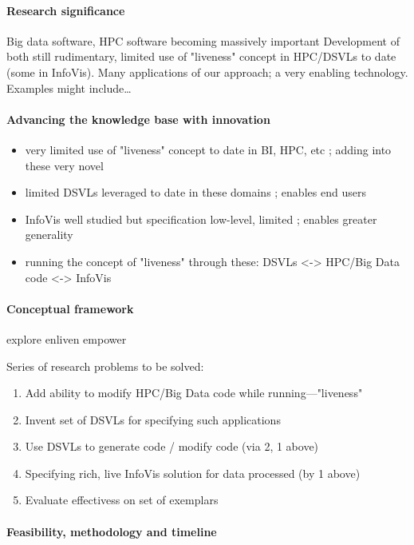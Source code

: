 \documentclass[a4paper]{scrartcl}
\begin{document}
\paragraph{Research significance}

Big data software, HPC software becoming massively important
Development of both still rudimentary, limited use of "liveness"
concept in HPC/DSVLs to date (some in InfoVis). Many applications of
our approach; a very enabling technology. Examples might include\ldots

\paragraph{Advancing the knowledge base with innovation}

\begin{itemize}
\item very limited use of "liveness" concept to date in BI, HPC, etc ;
  adding into these very novel
\item limited DSVLs leveraged to date in these domains ; enables end
  users
\item InfoVis well studied but specification low-level, limited ;
  enables greater generality
\item running the concept of "liveness" through these: DSVLs <->
  HPC/Big Data code <-> InfoVis
\end{itemize}
\paragraph{Conceptual framework}

explore \rightarrow enliven \rightarrow empower

Series of research problems to be solved:

\begin{enumerate}
\item Add ability to modify HPC/Big Data code while
  running---"liveness"
\item Invent set of DSVLs for specifying such applications
\item Use DSVLs to generate code / modify code (via 2, 1 above)
\item Specifying rich, live InfoVis solution for data processed (by 1
  above)
\item Evaluate effectivess on set of exemplars
\end{enumerate}

\paragraph{Feasibility, methodology and timeline}
\end{document}
